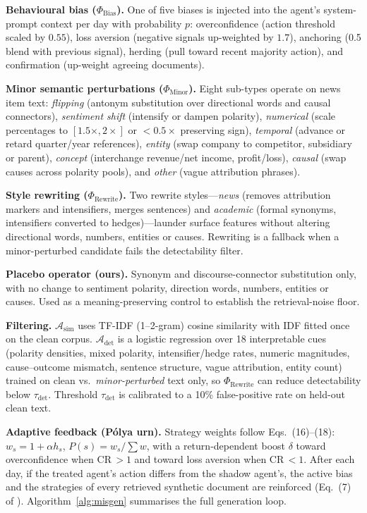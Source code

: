 \documentclass[conference]{IEEEtran}
\begin{document}
\textbf{Behavioural bias ($\Phi_{\text{Bias}}$).}
One of five biases is injected into the agent's system-prompt context per day
with probability $p$: overconfidence (action threshold scaled by $0.55$),
loss aversion (negative signals up-weighted by $1.7$), anchoring
(0.5 blend with previous signal), herding (pull toward recent majority action),
and confirmation (up-weight agreeing documents).

\textbf{Minor semantic perturbations ($\Phi_{\text{Minor}}$).}
Eight sub-types operate on news item text:
\emph{flipping} (antonym substitution over directional words and causal
connectors), \emph{sentiment shift} (intensify or dampen polarity),
\emph{numerical} (scale percentages to $[1.5\times, 2\times]$ or
$<0.5\times$ preserving sign), \emph{temporal} (advance or retard
quarter/year references), \emph{entity} (swap company to competitor,
subsidiary or parent), \emph{concept} (interchange revenue/net income,
profit/loss), \emph{causal} (swap causes across polarity pools), and
\emph{other} (vague attribution phrases).

\textbf{Style rewriting ($\Phi_{\text{Rewrite}}$).}
Two rewrite styles---\emph{news} (removes attribution markers and
intensifiers, merges sentences) and \emph{academic} (formal synonyms,
intensifiers converted to hedges)---launder surface features without
altering directional words, numbers, entities or causes.
Rewriting is a fallback when a minor-perturbed candidate fails the
detectability filter.

\textbf{Placebo operator (ours).}
Synonym and discourse-connector substitution only, with no change to
sentiment polarity, direction words, numbers, entities or causes.
Used as a meaning-preserving control to establish the retrieval-noise floor.

\textbf{Filtering.}
$\mathcal{A}_{\text{sim}}$ uses TF-IDF (1--2-gram) cosine similarity with
IDF fitted once on the clean corpus.
$\mathcal{A}_{\text{det}}$ is a logistic regression over 18 interpretable
cues (polarity densities, mixed polarity, intensifier/hedge rates, numeric
magnitudes, cause--outcome mismatch, sentence structure, vague attribution,
entity count) trained on clean vs.\ \emph{minor-perturbed} text only, so
$\Phi_{\text{Rewrite}}$ can reduce detectability below $\tau_{\text{det}}$.
Threshold $\tau_{\text{det}}$ is calibrated to a 10\% false-positive rate
on held-out clean text.

\textbf{Adaptive feedback (P\'olya urn).}
Strategy weights follow \cite{liu2026autoredtrader} Eqs.~(16)--(18):
$w_s = 1 + \alpha h_s$, $P(s) = w_s / \sum w$, with a return-dependent
boost $\delta$ toward overconfidence when CR\,$>\!1$ and toward loss
aversion when CR\,$<\!1$.
After each day, if the treated agent's action differs from the shadow agent's,
the active bias and the strategies of every retrieved synthetic document are
reinforced (Eq.~(7) of \cite{liu2026autoredtrader}).
Algorithm~\ref{alg:misgen} summarises the full generation loop.
\end{document}
